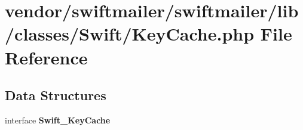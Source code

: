 \section{vendor/swiftmailer/swiftmailer/lib/classes/\+Swift/\+Key\+Cache.php File Reference}
\label{_key_cache_8php}
\subsection*{Data Structures}
\begin{DoxyCompactItemize}
\item 
interface {\bf Swift\+\_\+\+Key\+Cache}
\end{DoxyCompactItemize}
